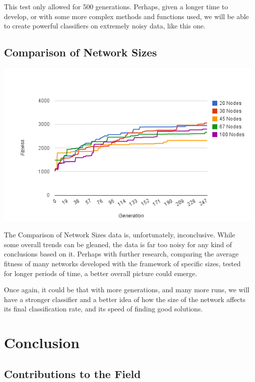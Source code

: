 \documentclass[a4paper,11pt]{report}
\begin{document}
This test only allowed for 500 generations. Perhaps, given a longer time to develop, or with some more complex 
methods and functions used, we will be able to create powerful classifiers on extremely noisy data, like this one. 

\section{Comparison of Network Sizes}

\begin{center}
 \includegraphics[width=400pt,keepaspectratio=true]{./Report/size-compare.png}
\end{center}

The Comparison of Network Sizes data is, unfortunately, inconclusive. While some overall trends 
can be gleaned, the data is far too noisy for any kind of conclusions based on it. Perhaps with 
further research, comparing the average fitness of many networks developed with the framework 
of specific sizes, tested for longer periods of time, a better overall picture could emerge. 

Once again, it could be that with more generations, and many more runs, we will have a stronger classifier
and a better idea of how the size of the network affects its final classification rate, and its speed 
of finding good solutions. 

\chapter{Conclusion}

\section{Contributions to the Field}
\end{document}
